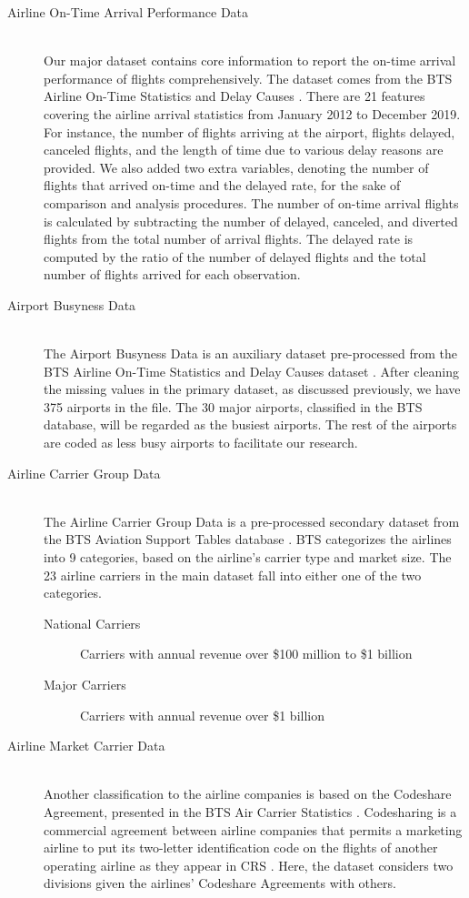 \documentclass[11pt, letterpaper]{article}
\begin{document}
\begin{description}
  \item[Airline On-Time Arrival Performance Data] \hfill \\ Our major dataset contains core information to report the on-time arrival performance of flights comprehensively. The dataset comes from the BTS Airline On-Time Statistics and Delay Causes \cite{web:bts1}. There are 21 features covering the airline arrival statistics from January 2012 to December 2019. For instance, the number of flights arriving at the airport, flights delayed, canceled flights, and the length of time due to various delay reasons are provided. We also added two extra variables, denoting the number of flights that arrived on-time and the delayed rate, for the sake of comparison and analysis procedures. The number of on-time arrival flights is calculated by subtracting the number of delayed, canceled, and diverted flights from the total number of arrival flights. The delayed rate is computed by the ratio of the number of delayed flights and the total number of flights arrived for each observation.
  \item[Airport Busyness Data] \hfill \\ The Airport Busyness Data is an auxiliary dataset pre-processed from the BTS Airline On-Time Statistics and Delay Causes dataset \cite{web:bts1}. After cleaning the missing values in the primary dataset, as discussed previously, we have 375 airports in the file. The 30 major airports, classified in the BTS database, will be regarded as the busiest airports. The rest of the airports are coded as less busy airports to facilitate our research.
  \item[Airline Carrier Group Data] \hfill \\ The Airline Carrier Group Data is a pre-processed secondary dataset from the BTS Aviation Support Tables database \cite{web:bts2}. BTS categorizes the airlines into 9 categories, based on the airline's carrier type and market size. The 23 airline carriers in the main dataset fall into either one of the two categories.
  \begin{description}
  \item[National Carriers] Carriers with annual revenue over \$100 million to \$1 billion
  \item[Major Carriers] Carriers with annual revenue over \$1 billion
  \end{description}
  \item[Airline Market Carrier Data] \hfill \\ Another classification to the airline companies is based on the Codeshare Agreement, presented in the BTS Air Carrier Statistics \cite{web:bts3}. Codesharing is a commercial agreement between airline companies that permits a marketing airline to put its two-letter identification code on the flights of another operating airline as they appear in CRS \cite{web:gsa}. Here, the dataset considers two divisions given the airlines' Codeshare Agreements with others.

\end{description}
\end{document}
